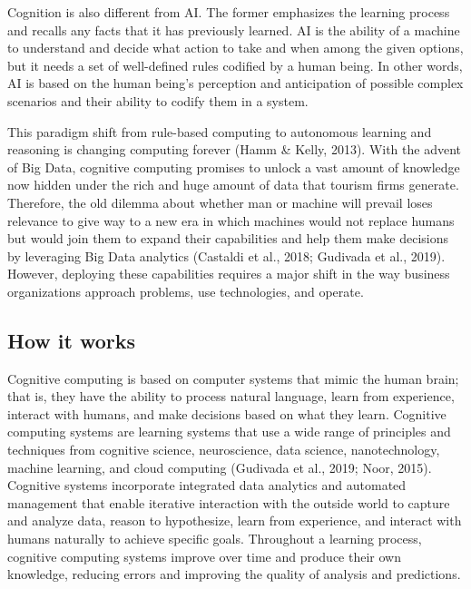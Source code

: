 \documentclass[
  letterpaper,
  DIV=11,
  numbers=noendperiod]{scrreprt}
\begin{document}
Cognition is also different from AI. The former emphasizes the learning
process and recalls any facts that it has previously learned. AI is the
ability of a machine to understand and decide what action to take and
when among the given options, but it needs a set of well-defined rules
codified by a human being. In other words, AI is based on the human
being's perception and anticipation of possible complex scenarios and
their ability to codify them in a system.

This paradigm shift from rule-based computing to autonomous learning and
reasoning is changing computing forever (Hamm \& Kelly, 2013). With the
advent of Big Data, cognitive computing promises to unlock a vast amount
of knowledge now hidden under the rich and huge amount of data that
tourism firms generate. Therefore, the old dilemma about whether man or
machine will prevail loses relevance to give way to a new era in which
machines would not replace humans but would join them to expand their
capabilities and help them make decisions by leveraging Big Data
analytics (Castaldi et al., 2018; Gudivada et al., 2019). However,
deploying these capabilities requires a major shift in the way business
organizations approach problems, use technologies, and operate.

\hypertarget{how-it-works-2}{%
\subsection{How it works}\label{how-it-works-2}}

Cognitive computing is based on computer systems that mimic the human
brain; that is, they have the ability to process natural language, learn
from experience, interact with humans, and make decisions based on what
they learn. Cognitive computing systems are learning systems that use a
wide range of principles and techniques from cognitive science,
neuroscience, data science, nanotechnology, machine learning, and cloud
computing (Gudivada et al., 2019; Noor, 2015). Cognitive systems
incorporate integrated data analytics and automated management that
enable iterative interaction with the outside world to capture and
analyze data, reason to hypothesize, learn from experience, and interact
with humans naturally to achieve specific goals. Throughout a learning
process, cognitive computing systems improve over time and produce their
own knowledge, reducing errors and improving the quality of analysis and
predictions.
\end{document}
